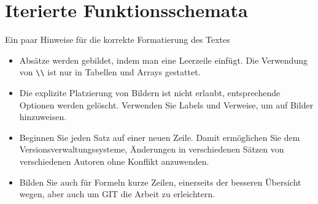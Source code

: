 %
%
%
\chapter{Iterierte Funktionsschemata\label{chapter:ifs}}
\begin{refsection}

Ein paar Hinweise für die korrekte Formatierung des Textes
\begin{itemize}
\item
Absätze werden gebildet, indem man eine Leerzeile einfügt.
Die Verwendung von \verb+\\+ ist nur in Tabellen und Arrays gestattet.
\item
Die explizite Platzierung von Bildern ist nicht erlaubt, entsprechende
Optionen werden gelöscht. 
Verwenden Sie Labels und Verweise, um auf Bilder hinzuweisen.
\item
Beginnen Sie jeden Satz auf einer neuen Zeile. 
Damit ermöglichen Sie dem Versionsverwaltungssysteme, Änderungen
in verschiedenen Sätzen von verschiedenen Autoren ohne Konflikt 
anzuwenden.
\item 
Bilden Sie auch für Formeln kurze Zeilen, einerseits der besseren
Übersicht wegen, aber auch um GIT die Arbeit zu erleichtern.
\end{itemize}






\printbibliography[heading=subbibliography]
\end{refsection}
